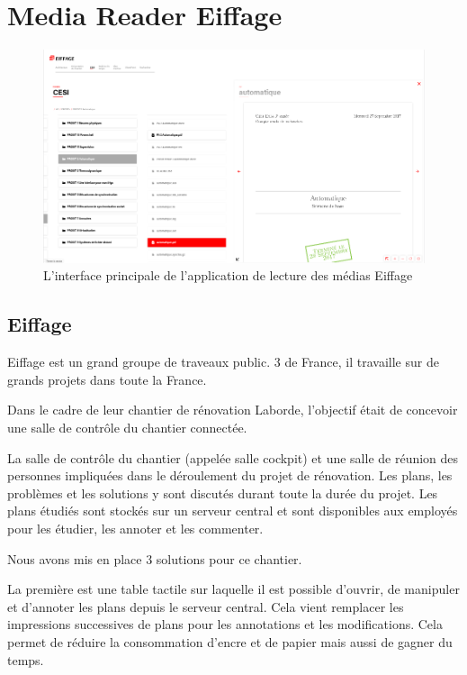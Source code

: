 \section{Media Reader Eiffage}

\begin{figure}[h]
    \centering
    \includegraphics[scale=0.5]{img/media-reader.png}
    \caption{L'interface principale de l'application de lecture des médias Eiffage}
\end{figure}

\subsection{Eiffage}

Eiffage est un grand groupe de traveaux public.
3 de France, il travaille sur de grands projets dans toute la France.

Dans le cadre de leur chantier de rénovation Laborde, l'objectif était de concevoir une salle de contrôle du chantier connectée.

La salle de contrôle du chantier (appelée salle cockpit) et une salle de réunion des personnes impliquées dans le déroulement du projet de rénovation.
Les plans, les problèmes et les solutions y sont discutés durant toute la durée du projet.
Les plans étudiés sont stockés sur un serveur central et sont disponibles aux employés pour les étudier, les annoter et les commenter.

\medskip

Nous avons mis en place 3 solutions pour ce chantier.

La première est une table tactile sur laquelle il est possible d'ouvrir, de manipuler et d'annoter les plans depuis le serveur central.
Cela vient remplacer les impressions successives de plans pour les annotations et les modifications.
Cela permet de réduire la consommation d'encre et de papier mais aussi de gagner du temps.

